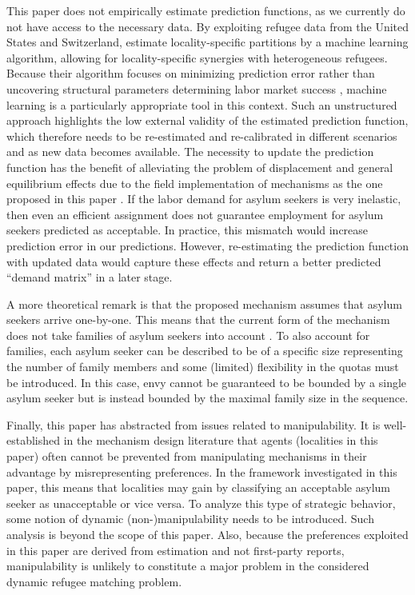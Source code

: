 \documentclass[12pt,fleqn]{article}
\begin{document}
This paper does not empirically estimate prediction functions, as we currently do not have access to the necessary data. By exploiting refugee data from the United States and Switzerland, \cite{bib:BansakEtAl} estimate locality-specific partitions by a machine learning algorithm, allowing for locality-specific synergies with heterogeneous refugees. Because their algorithm focuses on minimizing prediction error rather than uncovering structural parameters determining labor market success \citep{bib:MullainathanSpiess}, machine learning is a particularly appropriate tool in this context. Such an unstructured approach highlights the low external validity of the estimated prediction function, which therefore needs to be re-estimated and re-calibrated in different scenarios and as new data becomes available. The necessity to update the prediction function has the benefit of alleviating the problem of displacement and general equilibrium effects due to the field implementation of mechanisms as the one proposed in this paper \citep{bib:CreponEtAl}. If the labor demand for asylum seekers is very inelastic, then even an efficient assignment does not guarantee employment for asylum seekers predicted as acceptable. In practice, this mismatch would increase prediction error in our predictions. However, re-estimating the prediction function with updated data would capture these effects and return a better predicted ``demand matrix'' in a later stage.

A more theoretical remark is that the proposed mechanism assumes that asylum seekers arrive one-by-one. This means that the current form of the mechanism does not take families of asylum seekers into account \citep[see, e.g.,][for a mechanism that keeps families intact in house allocation problems with asylum seekers]{bib:AnderssonEhlers}. To also account for families, each asylum seeker can be described to be of a specific size representing the number of family members and some (limited) flexibility in the quotas must be introduced. In this case, envy cannot be guaranteed to be bounded by a single asylum seeker but is instead bounded by the maximal family size in the sequence.

Finally, this paper has abstracted from issues related to manipulability. It is  well-established in the mechanism design literature that agents (localities in this paper) often cannot be prevented from manipulating mechanisms in their advantage by misrepresenting preferences. In the framework investigated in this paper, this means that localities may gain by classifying an acceptable asylum seeker as unacceptable or vice versa. To analyze this type of strategic behavior, some notion of dynamic (non-)manipulability needs to be introduced. Such analysis is beyond the scope of this paper. Also, because the preferences exploited in this paper are derived from estimation and not first-party reports, manipulability is unlikely to constitute a major problem in the considered dynamic refugee matching problem.
\end{document}
